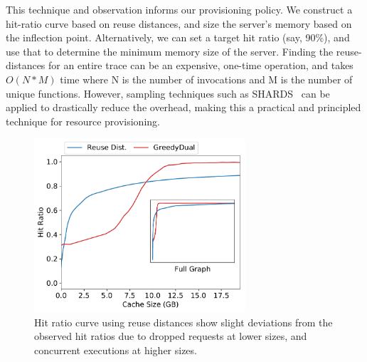 This technique and observation informs our provisioning policy.
We construct a hit-ratio curve based on reuse distances, and size the server's memory based on the inflection point.
Alternatively, we can set a target hit ratio (say, 90\%), and use that to determine the minimum memory size of the server. 
%
Finding the reuse-distances for an entire trace can be an expensive, one-time operation, and takes $O(N*M)$ time where N is the number of invocations and M is the number of unique functions. 
However, sampling techniques such as SHARDS~\cite{shards} can be applied to drastically reduce the overhead, making this a practical and principled technique for resource provisioning. 



\begin{figure}[t]
  \centering
  \includegraphics[width=0.7\textwidth]{faascache/faas-keepalive-20/graphs/rep-funcs-392/hit-ratio-392-b.pdf}
  \caption{Hit ratio curve using reuse distances show slight deviations from the observed hit ratios due to dropped requests at lower sizes, and concurrent executions at higher sizes.}
  \label{fig:hrc}
\end{figure}

